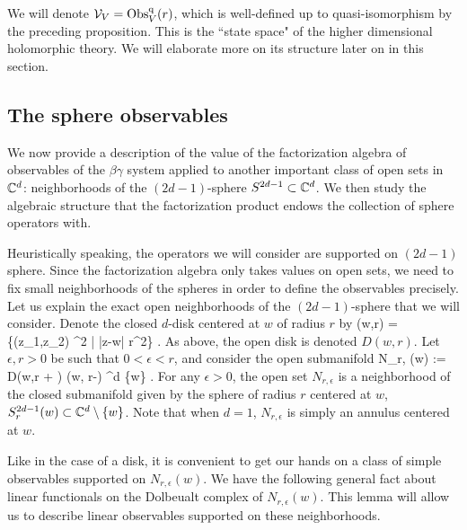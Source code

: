 \documentclass[10pt]{amsart}
\begin{document}
We will denote $\mathcal{V}_V = {\rm Obs}_V^{\rm q}(r)$, which is well-defined up to quasi-isomorphism by the preceding proposition. 
This is the ``state space" of the higher dimensional holomorphic theory. 
We will elaborate more on its structure later on in this section.

\subsection{The sphere observables}

We now provide a description of the value of the factorization algebra of observables of the $\beta\gamma$ system applied to another important class of open sets in $\mathbb C^d$: neighborhoods of the $(2d-1)$-sphere $S^{2d-1} \subset \mathbb C^d$. 
We then study the algebraic structure that the factorization product endows the collection of sphere operators with.

Heuristically speaking, the operators we will consider are supported on $(2d-1)$ sphere.
Since the factorization algebra only takes values on open sets, we need to fix small neighborhoods of the spheres in order to define the observables precisely.
Let us explain the exact open neighborhoods of the $(2d-1)$-sphere that we will consider.
Denote the closed $d$-disk centered at $w$ of radius $r$ by
\ben
{}(w,r) = \left\{(z_1,z_2) \in \CC^2 \; | \; |z-w| \leq r^2\right\} . 
\een
As above, the open disk is denoted $D(w,r)$. 
Let $\epsilon,r > 0$ be such that $0 < \epsilon < r$, and consider the open submanifold
\ben
N_{r, \epsilon}(w) := D(w,r + \epsilon) \setminus {}(w, r-\epsilon) \subset \CC^d \setminus \{w\} .
\een 
For any $\epsilon > 0$, the open set $N_{r,\epsilon}$ is a neighborhood of the closed submanifold given by the sphere of radius $r$ centered at $w$, $S^{2d-1}_r(w) \subset \mathbb C^d \setminus \{w\}$. 
Note that when $d=1$, $N_{r,\epsilon}$ is simply an annulus centered at $w$. 

Like in the case of a disk, it is convenient to get our hands on a class of simple observables supported on $N_{r,\epsilon}(w)$. 
We have the following general fact about linear functionals on the Dolbeualt complex of $N_{r,\epsilon}(w)$. 
This lemma will allow us to describe linear observables supported on these neighborhoods. 
\end{document}
